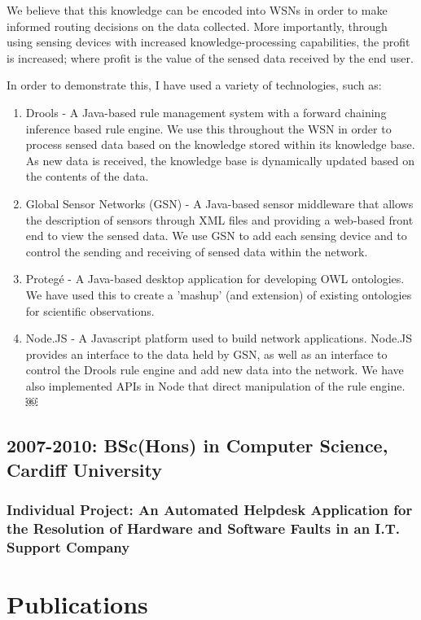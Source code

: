 \documentclass[11pt,fullpage]{article}
\begin{document}
We believe that this knowledge can be encoded into WSNs in order to make informed routing decisions on the data collected. More importantly, through using sensing devices with increased knowledge-processing capabilities, the profit is increased; where profit is the value of the sensed data received by the end user.

In order to demonstrate this, I have used a variety of technologies, such as:
\begin{enumerate}
	\item Drools - A Java-based rule management system with a forward chaining inference based rule engine. We use this throughout the WSN in order to process sensed data based on the knowledge stored within its knowledge base. As new data is received, the knowledge base is dynamically updated based on the contents of the data.
	\item Global Sensor Networks (GSN) - A Java-based sensor middleware that allows the description of sensors through XML files and providing a web-based front end to view the sensed data. We use GSN to add each sensing device and to control the sending and receiving of sensed data within the network.
	\item Protegé - A Java-based desktop application for developing OWL ontologies. We have used this to create a 'mashup' (and extension) of existing ontologies for scientific observations.
	\item Node.JS - A Javascript platform used to build network applications. Node.JS provides an interface to the data held by GSN, as well as an interface to control the Drools rule engine and add new data into the network. We have also implemented APIs in Node that direct manipulation of the rule engine.
￼\end{enumerate}
	
\subsection*{\textbf{2007-2010: BSc(Hons)} in Computer Science, Cardiff University}
\subsubsection*{\textbf{Individual Project:} An Automated Helpdesk Application for the Resolution of Hardware and Software Faults in an I.T. Support Company}
\section*{Publications}
\end{document}
